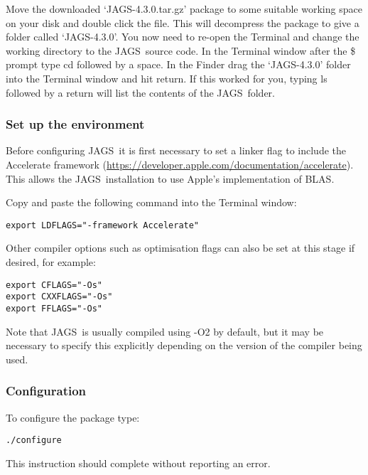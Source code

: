 \documentclass[11pt, a4paper, titlepage]{article}
\newcommand{\release}{4.3.0}
\newcommand{\JAGS}{\textsf{JAGS}}
\newcommand{\code}[1]{{\bgroup{\normalfont\ttfamily #1}\egroup}}
\newcommand{\file}[1]{{`\normalfont\textsf{#1}'}}
\begin{document}
Move the downloaded \file{JAGS-\release.tar.gz} package to some suitable
working space on your disk and double click the file.  This will
decompress the package to give a folder called \file{JAGS-\release}.  
You now need to re-open the Terminal and
change the working directory to the \JAGS\ source code. In the Terminal
window after the \$ prompt type \code{cd} followed by a space.  In the Finder
drag the \file{JAGS-\release} folder into the Terminal window and hit return.  If this
worked for you, typing \code{ls} followed by a return will list the contents
of the \JAGS\ folder.


\subsubsection{Set up the environment}
\label{section:osxenvironment}

Before configuring \JAGS\ it is first necessary to set a linker flag to
include the Accelerate framework (\url{https://developer.apple.com/documentation/accelerate}).  
This allows the \JAGS\ installation to use Apple's implementation of BLAS.

Copy and paste the following command into the Terminal window:

\begin{verbatim}
export LDFLAGS="-framework Accelerate"
\end{verbatim}

Other compiler options such as optimisation flags can also be set at 
this stage if desired, for example:

\begin{verbatim}
export CFLAGS="-Os"
export CXXFLAGS="-Os"
export FFLAGS="-Os"
\end{verbatim}

Note that \JAGS\ is usually compiled using \code{-O2} by default, but 
it may be necessary to specify this explicitly depending on the version
of the compiler being used.

\subsubsection{Configuration}

To configure the package type:

\begin{verbatim}
./configure
\end{verbatim}

This instruction should complete without reporting an error.
\end{document}
